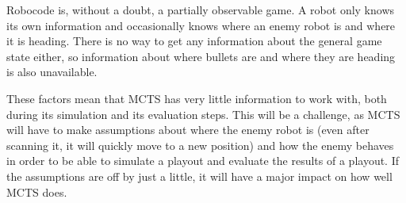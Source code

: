 Robocode is, without a doubt, a partially observable game. A robot only knows its own information and occasionally knows where an enemy robot is and where it is heading. There is no way to get any information about the general game state either, so information about where bullets are and where they are heading is also unavailable.

These factors mean that MCTS has very little information to work with, both during its simulation and its evaluation steps. This will be a challenge, as MCTS will have to make assumptions about where the enemy robot is (even after scanning it, it will quickly move to a new position) and how the enemy behaves in order to be able to simulate a playout and evaluate the results of a playout. If the assumptions are off by just a little, it will have a major impact on how well MCTS does.

